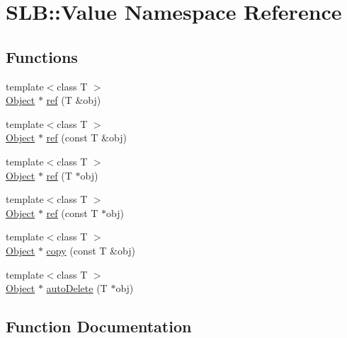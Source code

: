 \hypertarget{namespaceSLB_1_1Value}{}\section{S\+LB\+:\+:Value Namespace Reference}
\label{namespaceSLB_1_1Value}
\subsection*{Functions}
\begin{DoxyCompactItemize}
\item 
{\footnotesize template$<$class T $>$ }\\\hyperlink{classSLB_1_1Object}{Object} $\ast$ \hyperlink{namespaceSLB_1_1Value_a37ade7a501fa828d1489c507bf23433a}{ref} (T \&obj)
\item 
{\footnotesize template$<$class T $>$ }\\\hyperlink{classSLB_1_1Object}{Object} $\ast$ \hyperlink{namespaceSLB_1_1Value_a8ceb9ae06d31b06cedfe7d3a0ef72247}{ref} (const T \&obj)
\item 
{\footnotesize template$<$class T $>$ }\\\hyperlink{classSLB_1_1Object}{Object} $\ast$ \hyperlink{namespaceSLB_1_1Value_aa3155d26806f00d4d2d4cda3f18ca5e3}{ref} (T $\ast$obj)
\item 
{\footnotesize template$<$class T $>$ }\\\hyperlink{classSLB_1_1Object}{Object} $\ast$ \hyperlink{namespaceSLB_1_1Value_a3dbef9986ea54e5b0899f1a4ba61776e}{ref} (const T $\ast$obj)
\item 
{\footnotesize template$<$class T $>$ }\\\hyperlink{classSLB_1_1Object}{Object} $\ast$ \hyperlink{namespaceSLB_1_1Value_a8f94bbfcb2cb31a43aa2595ed584ee7f}{copy} (const T \&obj)
\item 
{\footnotesize template$<$class T $>$ }\\\hyperlink{classSLB_1_1Object}{Object} $\ast$ \hyperlink{namespaceSLB_1_1Value_a3242d17dce782165cae61fc963ee1177}{auto\+Delete} (T $\ast$obj)
\end{DoxyCompactItemize}


\subsection{Function Documentation}
